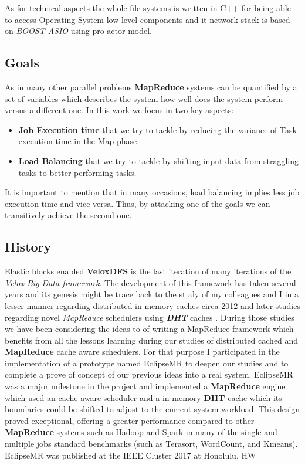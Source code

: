 As for technical aspects the whole file systems is written in C++ for being
able to access Operating System low-level components and it network stack is
based on \textit{BOOST ASIO} using pro-actor model.

\subsection{Goals} 

As in many other parallel problems \textbf{MapReduce} systems can be quantified
by a set of variables which describes the system how well does the system
perform versus a different one.  In this work we focus in two key aspects: 

\begin{itemize} 

  \item \textbf{Job Execution time} that we try to tackle by
    reducing the variance of Task execution time in the Map phase.  

  \item \textbf{Load Balancing} that we try to tackle by shifting input data from
      straggling tasks to better performing tasks.  

\end{itemize}

It is important to mention that in many occasions, load balancing implies less
job execution time and vice versa. Thus, by attacking one of the goals we can
transitively achieve the second one.

\subsection{History}

Elastic blocks enabled \textbf{VeloxDFS} is the last iteration of many
iterations of the \textit{Velox Big Data framework}. The development of this
framework has taken several years and its genesis might be trace back to the
study of my  colleagues and I in a lesser manner regarding distributed
in-memory caches circa 2012 \cite{nam2012high} and later studies regarding
novel \textit{MapReduce} schedulers using \textit{\textbf{DHT}} caches
\cite{eom2015kde}. During those studies we have been considering the ideas to
of writing a MapReduce framework which benefits from all the lessons learning
during our studies of distributed cached and \textbf{MapReduce} cache aware
schedulers. For that purpose I participated in the implementation of a
prototype named EclipseMR \cite{sanchez2017eclipsemr} to deepen our studies and
to complete a prove of concept of our previous ideas into a real system.
EclipseMR was a major milestone in the project and implemented a
\textbf{MapReduce} engine which used an cache aware scheduler and a in-memory
\textbf{DHT} cache which its boundaries could be shifted to adjust to the
current system workload. This design proved exceptional, offering a greater
performance compared to other \textbf{MapReduce} systems such as Hadoop and
Spark in many of the single and multiple jobs standard benchmarks (such as
Terasort, WordCount, and Kmeans). EclipseMR was published at the IEEE Cluster
2017 at Honolulu, HW\cite{sanchez2017eclipsemr}\\

